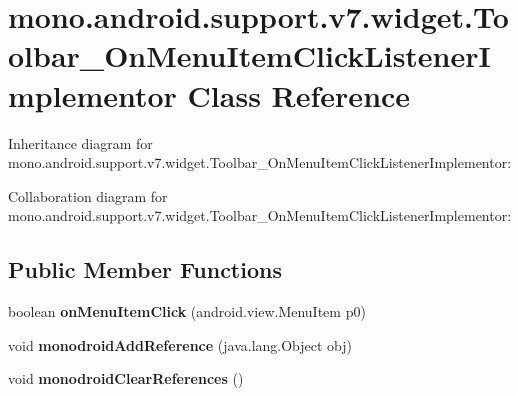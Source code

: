 \hypertarget{classmono_1_1android_1_1support_1_1v7_1_1widget_1_1_toolbar___on_menu_item_click_listener_implementor}{}\section{mono.\+android.\+support.\+v7.\+widget.\+Toolbar\+\_\+\+On\+Menu\+Item\+Click\+Listener\+Implementor Class Reference}
\label{classmono_1_1android_1_1support_1_1v7_1_1widget_1_1_toolbar___on_menu_item_click_listener_implementor}


Inheritance diagram for mono.\+android.\+support.\+v7.\+widget.\+Toolbar\+\_\+\+On\+Menu\+Item\+Click\+Listener\+Implementor\+:


Collaboration diagram for mono.\+android.\+support.\+v7.\+widget.\+Toolbar\+\_\+\+On\+Menu\+Item\+Click\+Listener\+Implementor\+:
\subsection*{Public Member Functions}
\begin{DoxyCompactItemize}
\item 
\mbox{\label{classmono_1_1android_1_1support_1_1v7_1_1widget_1_1_toolbar___on_menu_item_click_listener_implementor_abe3c4f78338e12e9652ab414b15582d9}} 
boolean {\bfseries on\+Menu\+Item\+Click} (android.\+view.\+Menu\+Item p0)
\item 
\mbox{\label{classmono_1_1android_1_1support_1_1v7_1_1widget_1_1_toolbar___on_menu_item_click_listener_implementor_a6c66afd38fc5d57a713c37f2059db0f0}} 
void {\bfseries monodroid\+Add\+Reference} (java.\+lang.\+Object obj)
\item 
\mbox{\label{classmono_1_1android_1_1support_1_1v7_1_1widget_1_1_toolbar___on_menu_item_click_listener_implementor_a9e539eca7d6aaa4b43bd92a24f3ffe84}} 
void {\bfseries monodroid\+Clear\+References} ()
\end{DoxyCompactItemize}
